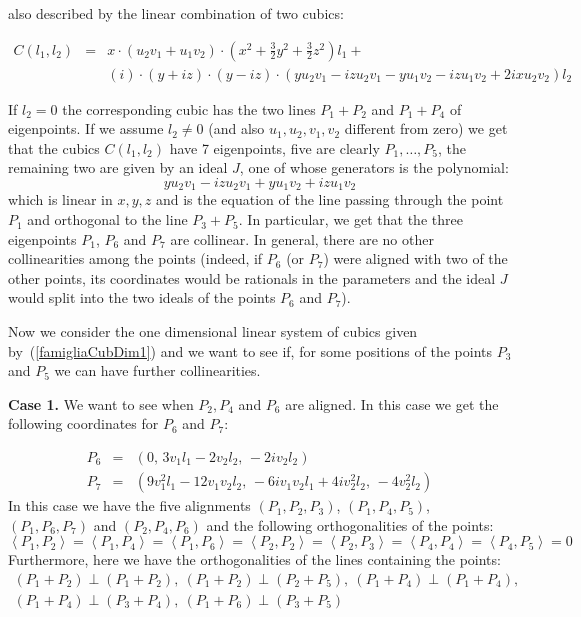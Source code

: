 \documentclass[12pt, a4paper, reqno, captions=tableheading,bibliography=totoc]{scrartcl}
\theoremstyle{plain}
\theoremstyle{definition}
\newcommand{\imunit}{i}
\newcommand{\scl}[2]{\left\langle {#1}, {#2} \right\rangle}
\begin{document}
also described by the linear combination of two cubics:

\begin{eqnarray}
  C(l_1, l_2) & = & x \cdot (u_{2} v_{1} + u_{1} v_{2}) \cdot (x^{2} + \frac{3}{2} y^{2} + \frac{3}{2} z^{2}) l_1+\\
  & &   \left(\imunit\right) \cdot (y + \imunit z) \cdot (y - \imunit z) \cdot (y u_{2} v_{1} - \imunit z u_{2} v_{1} - y u_{1} v_{2} - \imunit z u_{1} v_{2} + 2 \imunit x u_{2} v_{2})l_2  \nonumber
\label{famigliaCubDim1}
\end{eqnarray}

If $l_2=0$ the corresponding cubic has the two lines $P_1+P_2$ and $P_1+P_4$
of eigenpoints. If we assume $l_2 \not= 0$ (and also $u_1, u_2, v_1, v_2$
different from zero) we get that the cubics $C(l_1, l_2)$ have 7
eigenpoints, five are clearly $P_1, \dots, P_5$,
the remaining two are given by an ideal $J$, one of whose generators is the
polynomial:
\[
yu_2v_1 -\imunit zu_2v_1 + yu_1v_2 + \imunit zu_1v_2
\]
which is linear in $x, y, z$ and is the equation of the line passing
through the point $P_1$ and orthogonal to the line $P_3+P_5$. In particular,
we get that the three eigenpoints $P_1$, $P_6$ and $P_7$ are collinear.
In general, there are no other collinearities among the points (indeed, if
$P_6$ (or $P_7$) were aligned with two of the other points, its coordinates
would be rationals in the parameters and the ideal $J$ would split
into the two ideals of the points $P_6$ and $P_7$).


Now we consider the one dimensional linear system of cubics given
by~(\ref{famigliaCubDim1}) and we want to see if, for some positions
of the points $P_3$ and $P_5$ we can have further collinearities.

\textbf{Case 1.} We want to see when $P_2, P_4$ and $P_6$ are aligned.
In this case we get the following coordinates for $P_6$ and $P_7$:

\begin{eqnarray*}
  P_6 & = & \left(0,\,3 v_{1} l_{1} - 2 v_{2} l_{2},
  \,-2 \imunit v_{2} l_{2}\right)\\
  P_7 & = & \left(9 v_{1}^{2} l_{1} - 12 v_{1} v_{2} l_{2},
  \,-6 \imunit v_{1} v_{2} l_{1} + 4 \imunit v_{2}^{2} l_{2},
  \,-4 v_{2}^{2} l_{2}\right)
\end{eqnarray*}
In this case we have the five alignments $(P_1, P_2, P_3)$, $(P_1, P_4, P_5)$,
$(P_1, P_6, P_7)$ and $(P_2, P_4, P_6)$ and the following orthogonalities
of the points:
\[
\scl{P_1}{P_2} = \scl{P_1}{P_4} = \scl{P_1}{P_6} =
\scl{P_2}{P_2} = \scl{P_2}{P_3} = \scl{P_4}{P_4} =
\scl{P_4}{P_5} = 0
\]
Furthermore, here we have the orthogonalities of the lines containing
the points:
\[
\begin{array}{l}
(P_1+P_2) \perp (P_1+P_2), \ (P_1+P_2) \perp (P_2+P_5), \
  (P_1+P_4) \perp (P_1+P_4), \\
  (P_1+P_4) \perp (P_3+P_4), \ (P_1+P_6) \perp (P_3+P_5)
\end{array}
  \]
\end{document}
